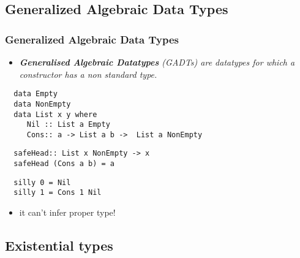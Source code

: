 \documentclass[aspectratio=43]{beamer}
\begin{document}
\subsection{Generalized Algebraic Data Types}

\begin{frame}[fragile]
 \frametitle{Generalized Algebraic Data Types}
 \begin{itemize}
  \item \textit{\textbf{Generalised Algebraic Datatypes} (GADTs) are datatypes for which a constructor has a non standard type.}
 \end{itemize}
 \pause
 \begin{lstlisting}
  data Empty
  data NonEmpty
  data List x y where
     Nil :: List a Empty
     Cons:: a -> List a b ->  List a NonEmpty
 \end{lstlisting}
 \pause
 \begin{lstlisting}
  safeHead:: List x NonEmpty -> x
  safeHead (Cons a b) = a
 \end{lstlisting}
 \pause
 \begin{lstlisting}
  silly 0 = Nil
  silly 1 = Cons 1 Nil
 \end{lstlisting}
 \pause
 \begin{itemize}
  \item it can't infer proper type!
 \end{itemize}
\end{frame}

\subsection{Existential types}
\end{document}
